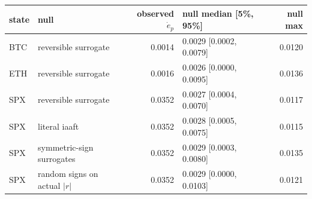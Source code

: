 \begin{tabular}{llrlr}\toprule state & null & observed $\dot e_p$ & null median [5\%, 95\%] & null max\\\midrule
BTC & reversible surrogate & 0.0014 & 0.0029 [0.0002, 0.0079] & 0.0120\\
ETH & reversible surrogate & 0.0016 & 0.0026 [0.0000, 0.0095] & 0.0136\\
SPX & reversible surrogate & 0.0352 & 0.0027 [0.0004, 0.0070] & 0.0117\\
SPX & literal iaaft & 0.0352 & 0.0028 [0.0005, 0.0075] & 0.0115\\
SPX & symmetric-sign surrogates & 0.0352 & 0.0029 [0.0003, 0.0080] & 0.0135\\
SPX & random signs on actual $|r|$ & 0.0352 & 0.0029 [0.0000, 0.0103] & 0.0121\\
\bottomrule\end{tabular}
